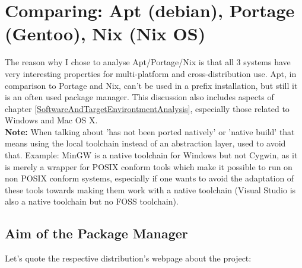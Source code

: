 \documentclass[a4paper,10pt]{article}
\begin{document}
\newpage
\section{Comparing: Apt (debian), Portage (Gentoo), Nix (Nix OS)}
\label{packagemanagementanalyzis}
The reason why I chose to analyse Apt/Portage/Nix is that all 3 systems have very interesting properties for multi-platform and cross-distribution use. Apt, in comparison to Portage and Nix, can't be used in a prefix installation, but still it is an often used package manager. This discussion also includes aspects of chapter \ref{SoftwareAndTargetEnvirontmentAnalysis}, especially those related to Windows and Mac OS X.\\

\textbf{Note:} When talking about 'has not been ported natively' or 'native build' that means using the local toolchain instead of an abstraction layer, used to avoid that. Example: MinGW is a native toolchain for Windows but not Cygwin, as it is merely a wrapper for POSIX conform tools which make it possible to run on non POSIX conform systems, especially if one wants to avoid the adaptation of these tools towards making them work with a native toolchain (Visual Studio is also a native toolchain but no FOSS toolchain).

\subsection{Aim of the Package Manager}
Let's quote the respective distribution's webpage about the project:


\end{document}
